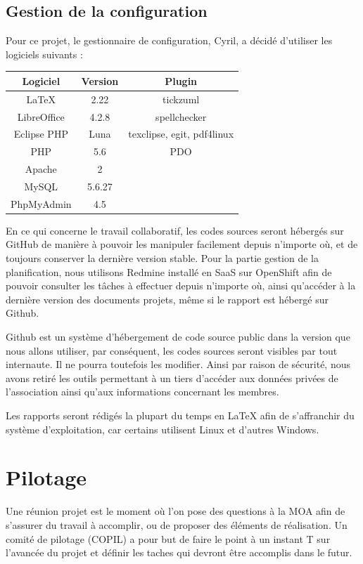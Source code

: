 \documentclass[11pt]{report}
\begin{document}
\subsection{Gestion de la configuration}
Pour ce projet, le gestionnaire de configuration, Cyril, a décidé d'utiliser
les logiciels suivants : \\ 
\par 
\begin{tabular}{ | c | c | c | }
\hline 
   Logiciel & Version & Plugin  \\ \hline 
   LaTeX & 2.22 & tickzuml \\ \hline 
   LibreOffice & 4.2.8 & spellchecker \\ \hline 
   Eclipse PHP & Luna & texclipse, egit, pdf4linux \\ \hline
   PHP & 5.6 & PDO \\ \hline
   Apache & 2 & \\ \hline
   MySQL & 5.6.27 & \\ \hline
   PhpMyAdmin & 4.5 & \\ \hline
 \end{tabular}
 
 \par En ce qui concerne le travail collaboratif, les codes sources seront
 hébergés sur GitHub de manière à pouvoir les manipuler facilement depuis
 n'importe où, et de toujours conserver la dernière version stable. Pour la
 partie gestion de la planification, nous utilisons Redmine installé en SaaS
 sur OpenShift afin de pouvoir consulter les tâches à effectuer depuis n'importe
 où, ainsi qu'accéder à la dernière version des documents projets, même si le
 rapport est hébergé sur Github.
 \par Github est un système d'hébergement de code source public dans la version 
 que nous allons utiliser, par conséquent, les codes sources seront visibles 
 par tout internaute. Il ne pourra toutefois les modifier. Ainsi par raison de
 sécurité, nous avons retiré les outils permettant à un tiers d'accéder aux
 données privées de l'association ainsi qu'aux informations concernant les
 membres.
 \par Les rapports seront rédigés la plupart du temps en LaTeX afin de
 s'affranchir du système d'exploitation, car certains utilisent Linux et
 d'autres Windows. 

\section{Pilotage}
 Une réunion projet est le moment où l'on pose des questions à la MOA afin de
s'assurer du travail à accomplir, ou de proposer des éléments de réalisation.
 Un comité de pilotage (COPIL) a pour but de faire le point à un instant T sur
l'avancée du projet et définir les taches qui devront être accomplis dans le 
futur. \\
\end{document}
